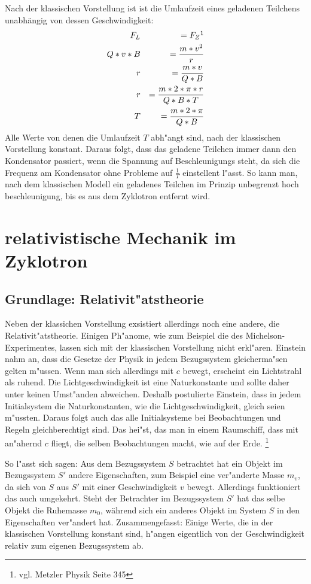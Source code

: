\documentclass[14pt, a4paper]{report}
\begin{document}
Nach der klassischen Vorstellung ist ist die Umlaufzeit eines geladenen Teilchens 
unabhängig von dessen Geschwindigkeit:
\begin{eqnarray}
  F_L  		&& = F_Z  \footnotemark \\
  Q * v * B 	&& = \frac{m * v^2}{r} \\
  r		&& = \frac{m * v}{Q * B} \\
  r		&& = \frac{m * 2 * \pi * r}{Q * B * T} \\
  T		&& = \frac{m * 2 * \pi }{Q * B} \label{klassische_Umlaufzeit}
\end{eqnarray}
Alle Werte von denen die Umlaufzeit $T$ abh"angt sind, nach der klassischen Vorstellung
konstant. Daraus folgt, dass das geladene Teilchen immer dann den Kondensator passiert,
wenn die Spannung auf Beschleunigungs steht, da sich die Frequenz am Kondensator ohne
Probleme auf $\frac{1}{T}$ einstellent l"asst. So kann man, nach dem klassischen Modell
ein geladenes Teilchen im Prinzip unbegrenzt hoch beschleunigung, bis es aus dem
Zyklotron entfernt wird. \label{klassische_Erwartung}

\chapter{relativistische Mechanik im Zyklotron}
\section{Grundlage: Relativit"atstheorie}
Neben der klassichen Vorstellung exsistiert allerdings noch eine andere, die 
Relativit"atstheorie. Einigen Ph"anome, wie zum Beispiel die des Michelson-Experimentes,
lassen sich mit der klassischen Vorstellung nicht erkl"aren. Einstein nahm an, dass 
die Gesetze der Physik in jedem Bezugssystem gleicherma"sen gelten m"ussen. 
Wenn man sich allerdings mit $c$ bewegt, erscheint ein Lichtstrahl als ruhend. 
Die Lichtgeschwindigkeit ist eine Naturkonstante und sollte daher unter keinen 
Umst"anden abweichen. Deshalb postulierte Einstein, dass in jedem Initialsystem die 
Naturkonstanten, wie die Lichtgeschwindigkeit, gleich seien m"ussten. Daraus folgt auch
das alle Initialsysteme bei Beobachtungen und Regeln gleichberechtigt sind. Das hei"st,
das man in einem Raumschiff, dass mit an"ahernd $c$ fliegt, die selben Beobachtungen 
macht, wie auf der Erde.
\footnote{vgl. Metzler Physik Seite 345}

So l"asst sich sagen: Aus dem Bezugssystem $S$ betrachtet hat 
ein Objekt im Bezugssystem $S'$ andere Eigenschaften, zum Beispiel eine ver"anderte 
Masse $m_v$, da sich von $S$ aus $S'$ mit einer Geschwindigkeit $v$ bewegt. 
Allerdings funktioniert das auch umgekehrt. Steht der Betrachter im Bezugssystem $S'$ 
hat das selbe Objekt die Ruhemasse $m_0$, während sich ein anderes Objekt im System $S$ 
in den Eigenschaften ver"andert hat. Zusammengefasst: Einige Werte, die in der 
klassischen Vorstellung konstant sind, h"angen eigentlich von der Geschwindigkeit 
relativ zum eigenen Bezugssystem ab.
\end{document}
